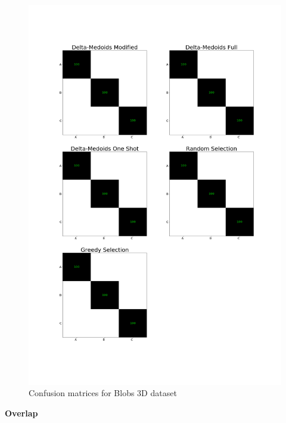 \documentclass[thesis=B,english]{FITthesis}[2012/10/20]
\begin{document}
\begin{figure}[t]
   \includegraphics[width=\linewidth]{img/exp1_blobs.png}
  \caption{Confusion matrices for Blobs 3D dataset}
  \label{img:exp1_blobs}
\end{figure}
\medskip

\textbf{Overlap}
\end{document}
